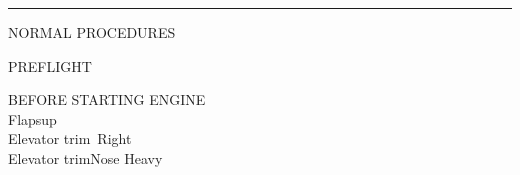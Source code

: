 \documentclass[11pt,letterpaper]{article}
\newcommand*{\doctitle}[1]{{\Huge\sf#1}} %
\newcommand*{\protitle}[1]{{\Large\sf#1}} %
\newcommand*{\proitem}[2]{#1\dotfill#2} %
\newcommand*{\separator}{\noindent\rule{\textwidth}{1pt}\vspace{0.5in}}
\begin{document}
\separator

\centering

\doctitle{NORMAL PROCEDURES}

	\begin{multicols}{2}

	\protitle{PREFLIGHT}

	\protitle{BEFORE STARTING ENGINE}\\
	\vspace{0.1in}
	\proitem{Flaps}{up}\\
	\proitem{Elevator trim}{5\textdegree\ Right}\\
	\proitem{Elevator trim}{Nose Heavy}
	\end{multicols}
\end{document}
